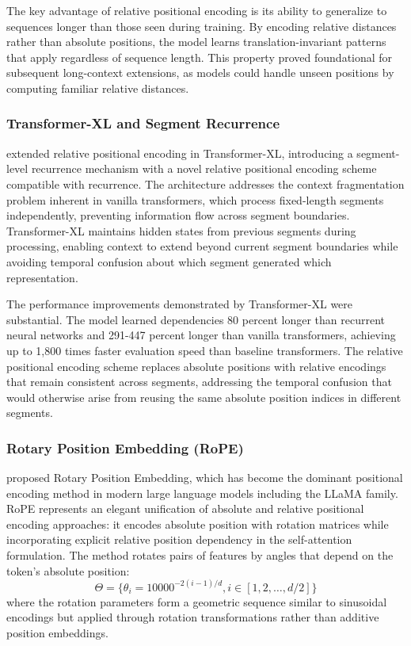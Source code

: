 \documentclass[11pt,letterpaper]{article}
\begin{document}
The key advantage of relative positional encoding is its ability to generalize to sequences longer than those seen during training. By encoding relative distances rather than absolute positions, the model learns translation-invariant patterns that apply regardless of sequence length. This property proved foundational for subsequent long-context extensions, as models could handle unseen positions by computing familiar relative distances.

\subsubsection{Transformer-XL and Segment Recurrence}

\cite{dai2019transformerxl} extended relative positional encoding in Transformer-XL, introducing a segment-level recurrence mechanism with a novel relative positional encoding scheme compatible with recurrence. The architecture addresses the context fragmentation problem inherent in vanilla transformers, which process fixed-length segments independently, preventing information flow across segment boundaries. Transformer-XL maintains hidden states from previous segments during processing, enabling context to extend beyond current segment boundaries while avoiding temporal confusion about which segment generated which representation.

The performance improvements demonstrated by Transformer-XL were substantial. The model learned dependencies 80 percent longer than recurrent neural networks and 291-447 percent longer than vanilla transformers, achieving up to 1,800 times faster evaluation speed than baseline transformers. The relative positional encoding scheme replaces absolute positions with relative encodings that remain consistent across segments, addressing the temporal confusion that would otherwise arise from reusing the same absolute position indices in different segments.

\subsubsection{Rotary Position Embedding (RoPE)}

\cite{su2024roformer} proposed Rotary Position Embedding, which has become the dominant positional encoding method in modern large language models including the LLaMA family. RoPE represents an elegant unification of absolute and relative positional encoding approaches: it encodes absolute position with rotation matrices while incorporating explicit relative position dependency in the self-attention formulation. The method rotates pairs of features by angles that depend on the token's absolute position:
\begin{equation}
\Theta = \{\theta_i = 10000^{-2(i-1)/d}, i \in [1, 2, \ldots, d/2]\}
\end{equation}
where the rotation parameters form a geometric sequence similar to sinusoidal encodings but applied through rotation transformations rather than additive position embeddings.
\end{document}
